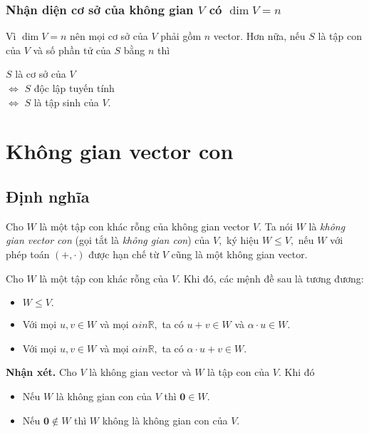 \subsubsection{Nhận diện cơ sở của không gian $V$ có $\dim V = n$}
Vì $\dim V = n$ nên mọi cơ sở của $V$ phải gồm $n$ vector. Hơn nữa, nếu $S$ là tập con của $V$ và số phần tử của $S$ bằng $n$ thì
\begin{center}
$S$ là cơ sở của $V$\\
$\Leftrightarrow$ $S$ độc lập tuyến tính\\
$\Leftrightarrow$ $S$ là tập sinh của $V.$
\end{center}
\section{Không gian vector con}
\subsection{Định nghĩa}
Cho $W$ là một tập con khác rỗng của không gian vector $V.$ Ta nói $W$ là \textit{không gian vector con} (gọi tắt là \textit{không gian con}) của $V,$ ký hiệu $W \leqslant V,$ nếu $W$ với phép toán $\left( + , \mathbf{\cdot} \right)$ được hạn chế từ $V$ cũng là một không gian vector.
\begin{mybox}
\begin{theorem}
Cho $W$ là một tập con khác rỗng của $V.$ Khi đó, các mệnh đề sau là tương đương:
\begin{itemize}
\item $W \leqslant V.$
\item Với mọi $u, v \in W$ và mọi $\alpha in \mathbb{R},$ ta có $u + v \in W$ và $\alpha \cdot u \in W.$
\item Với mọi $u, v \in W$ và mọi $\alpha in \mathbb{R},$ ta có $\alpha \cdot u + v \in W.$
\end{itemize}
\end{theorem}
\end{mybox}
\begin{mybox}
\textbf{Nhận xét.} Cho $V$ là không gian vector và $W$ là tập con của $V.$ Khi đó
\begin{itemize}
\item Nếu $W$ là không gian con của $V$ thì $\mathbf{0} \in W.$
\item Nếu $\mathbf{0} \notin W$ thì $W$ không là không gian con của $V.$
\end{itemize}
\end{mybox}
